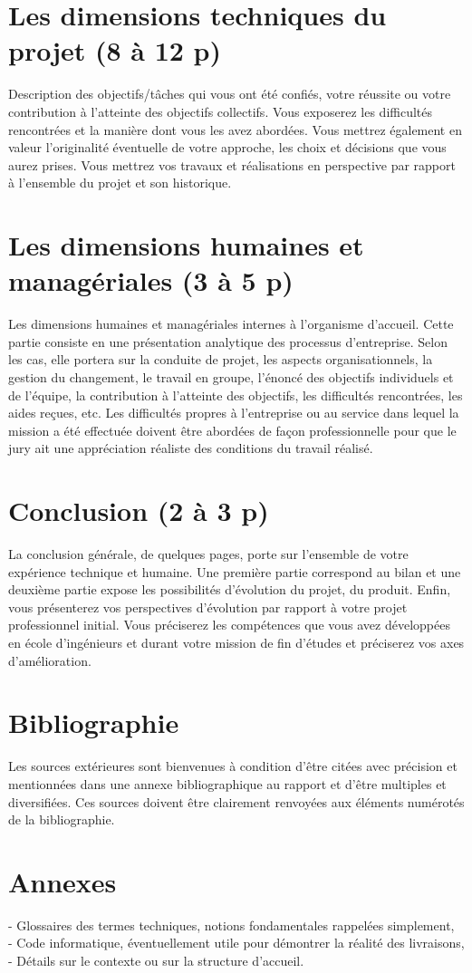 \documentclass[11pt]{article}
\begin{document}
  \pagebreak
  \section{Les dimensions techniques du projet (8 à 12 p)}
  Description des objectifs/tâches qui vous ont été confiés, votre réussite ou votre contribution à
  l’atteinte des objectifs collectifs. Vous exposerez les difficultés rencontrées et la manière dont vous
  les avez abordées. Vous mettrez également en valeur l’originalité éventuelle de votre approche, les
  choix et décisions que vous aurez prises. Vous mettrez vos travaux et réalisations en perspective par
  rapport à l’ensemble du projet et son historique.

  \pagebreak
  \section{Les dimensions humaines et managériales (3 à 5 p)}
  Les dimensions humaines et managériales internes à l’organisme d’accueil. Cette partie consiste en
  une présentation analytique des processus d’entreprise. Selon les cas, elle portera sur la conduite de
  projet, les aspects organisationnels, la gestion du changement, le travail en groupe, l’énoncé des
  objectifs individuels et de l’équipe, la contribution à l’atteinte des objectifs, les difficultés rencontrées,
  les aides reçues, etc. Les difficultés propres à l’entreprise ou au service dans lequel la mission a été
  effectuée doivent être abordées de façon professionnelle pour que le jury ait une appréciation réaliste
  des conditions du travail réalisé.  

  \pagebreak
  \section{Conclusion (2 à 3 p)}
  La conclusion générale, de quelques pages, porte sur l’ensemble de votre expérience technique et
  humaine. Une première partie correspond au bilan et une deuxième partie expose les possibilités
  d’évolution du projet, du produit. Enfin, vous présenterez vos perspectives d’évolution par rapport à
  votre projet professionnel initial. Vous préciserez les compétences que vous avez développées en
  école d’ingénieurs et durant votre mission de fin d’études et préciserez vos axes d’amélioration.

  \pagebreak
  \section{Bibliographie}
  Les sources extérieures sont bienvenues à condition d’être citées avec précision et mentionnées dans
  une annexe bibliographique au rapport et d’être multiples et diversifiées.
  Ces sources doivent être clairement renvoyées aux éléments numérotés de la bibliographie.

  \pagebreak
  \section{Annexes}
  - Glossaires des termes techniques, notions fondamentales rappelées simplement, \\
  - Code informatique, éventuellement utile pour démontrer la réalité des livraisons, \\
  - Détails sur le contexte ou sur la structure d’accueil. 
\end{document}
